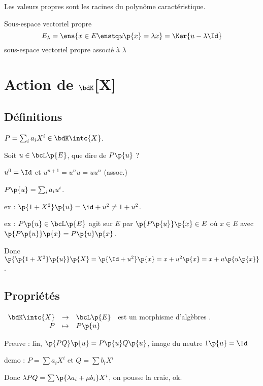 \documentclass[a4paper,french,bookmarks]{book}
\begin{document}
    \begin{property}{}{}
        Les valeurs propres sont les racines du polynôme caractéristique.
    \end{property}
    
    \begin{definition}{Sous-espace vectoriel propre}{}
        \[ E_\lambda = \ens{x \in E \enstq u\p{x} = \lambda x} = \Ker{u - \lambda \Id}\]
        sous-espace vectoriel propre associé à $\lambda$
    \end{definition}
    
    \section{Action de $\bdK$[X]}
    
    \subsection{Définitions}
    
    $P = \sum_i a_iX^i \in \bdK\intc{X}$.
    
    Soit $u \in \bcL\p{E}$, que dire de $P\p{u}$ ?
    
    $u^0 = \Id$ et $u^{n+1} = u^n u = uu^n$ (assoc.)
    
    $P\p{u} = \sum_i a_iu^i$.
    
    ex : $\p{1 + X^2}\p{u} = \id + u^2 \neq 1 + u^2$.
    
    ex : $P\p{u} \in \bcL\p{E}$ agit sur $E$ par $\p{P\p{u}}\p{x} \in E$ où $x \in E$ avec $\p{P\p{u}}\p{x} = P\p{u}\p{x}$.
    
    Donc $\p{\p{1 + X^2}\p{u}}\p{X} = \p{\Id + u^2}\p{x} = x + u^2\p{x} = x + u\p{u\p{x}}$.
    
    \subsection{Propriétés}
    
    $\begin{array}[t]{rcl}
        \bdK\intc{X} &\to& \bcL\p{E}  \\
        P &\mapsto& P\p{u} 
    \end{array}$ est un morphisme d'algèbres .
    
    Preuve : lin, $\p{PQ}\p{u} = P\p{u}Q\p{u}$, image du neutre $1\p{u} = \Id$
    
    demo : $P = \sum a_iX^i$ et $Q =\sum b_iX^i$
    
    Donc $\lambda P Q = \sum \p{\lambda a_i + \mu b_i}X^i$, on pousse la craie, ok.
    
\end{document}
